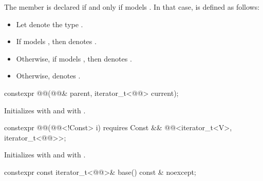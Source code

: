 \pnum
The member   is declared
if and only if  models .
In that case,
 is defined as follows:
\begin{itemize}
\item Let  denote the type
.

\item If  models
,
then  denotes .

\item Otherwise, if   models
,
then  denotes .

\item Otherwise,  denotes .
\end{itemize}

%
\begin{itemdecl}
constexpr @@(@@& parent, iterator_t<@@> current);
\end{itemdecl}

\begin{itemdescr}
\pnum
\effects
Initializes  with  and
 with .
\end{itemdescr}

%
\begin{itemdecl}
constexpr @@(@@<!Const> i)
  requires Const && @@<iterator_t<V>, iterator_t<@@>>;
\end{itemdecl}

\begin{itemdescr}
\pnum
\effects
Initializes  with  and
 with .
\end{itemdescr}

%
\begin{itemdecl}
constexpr const iterator_t<@@>& base() const & noexcept;
\end{itemdecl}

